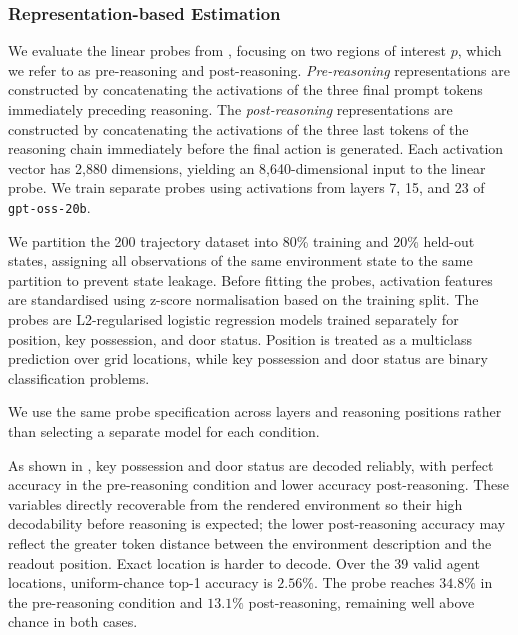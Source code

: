 \documentclass{article}
\begin{document}
\subsubsection{Representation-based Estimation}
We evaluate the linear probes from , focusing on two regions of interest $p$, which we refer to as pre-reasoning and post-reasoning.
\emph{Pre-reasoning} representations are constructed by concatenating the activations of the three final prompt tokens immediately preceding reasoning.
The \emph{post-reasoning} representations are constructed by concatenating the activations of the three last tokens of the reasoning chain immediately before the final action is generated.
Each activation vector has 2,880 dimensions, yielding an 8,640-dimensional input to the linear probe. 
We train separate probes using activations from layers 7, 15, and 23 of \texttt{gpt-oss-20b}.

We partition the 200 trajectory dataset into 80\% training and 20\% held-out states, assigning all observations of the same environment state to the same partition to prevent state leakage. Before fitting the probes, activation features are standardised using z-score normalisation based on the training split. The probes are L2-regularised logistic regression models trained separately for position, key possession, and door status. Position is treated as a
multiclass prediction over grid locations, while key possession and door
status are binary classification problems.

We use the same probe specification across layers and reasoning positions
rather than selecting a separate model for each condition.

As shown in , key possession and door status are decoded reliably, with perfect accuracy in the pre-reasoning condition and lower accuracy post-reasoning.
These variables directly recoverable from the rendered environment so their high decodability before reasoning is expected; the lower post-reasoning accuracy may reflect the greater token distance between the environment description and the readout position.
Exact location is harder to decode. Over the 39 valid agent locations, uniform-chance top-1 accuracy is \(2.56\%\). The probe reaches \(34.8\%\) in the pre-reasoning condition and \(13.1\%\) post-reasoning, remaining well above chance in both cases.
\end{document}
